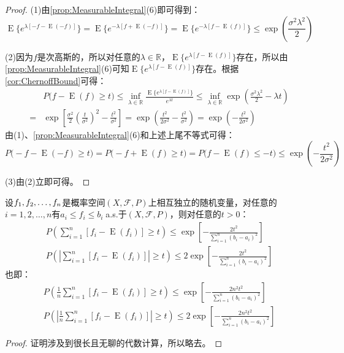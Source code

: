 \begin{proof}
	(1)由\cref{prop:MeasurableIntegral}(6)即可得到：
	\begin{equation*}
		\operatorname{E}\{e^{\lambda[-f-\operatorname{E}(-f)]}\}=\operatorname{E}\{e^{-\lambda[f+\operatorname{E}(-f)]}\}=\operatorname{E}\{e^{-\lambda[f-\operatorname{E}(f)]}\}\leqslant\exp\left(\frac{\sigma^2\lambda^2}{2}\right)
	\end{equation*}\par
	(2)因为$f$是次高斯的，所以对任意的$\lambda\in\mathbb{R}$，$\operatorname{E}\{e^{\lambda[f-\operatorname{E}(f)]}\}$存在，所以由\cref{prop:MeasurableIntegral}(6)可知$\operatorname{E}\{e^{\lambda[f-\operatorname{E}(f)]}\}$存在。根据\cref{cor:ChernoffBound}可得：
	\begin{align*}
		&P\Big(f-\operatorname{E}(f)\geqslant t\Big)\leqslant\inf_{\lambda\in\mathbb{R}}\frac{\operatorname{E}\{e^{\lambda[f-\operatorname{E}(f)]}\}}{e^{\lambda t}}\leqslant\inf_{\lambda\in\mathbb{R}}\exp\left(\frac{\sigma^2\lambda^2}{2}-\lambda t\right) \\
		=&\exp\left[\frac{\sigma^2}{2}\left(\frac{t}{\sigma^2}\right) ^2-\frac{t^2}{\sigma^2}\right]=\exp\left(\frac{t^2}{2\sigma^2}-\frac{t^2}{\sigma^2}\right)=\exp\left(-\frac{t^2}{2\sigma^2}\right)
	\end{align*}
	由(1)、\cref{prop:MeasurableIntegral}(6)和上述上尾不等式可得：
	\begin{equation*}
		P\Big(-f-\operatorname{E}(-f)\geqslant t\Big)=P\Big(-f+\operatorname{E}(f)\geqslant t\Big)=P\Big(f-\operatorname{E}(f)\leqslant -t\Big)\leqslant\exp\left(-\frac{t^2}{2\sigma^2}\right)
	\end{equation*}\par
	(3)由(2)立即可得。
\end{proof}
\begin{theorem}\label{theo:HoeffdingBound}
	设$f_1, f_2, \dots, f_{n}$是概率空间$(X,\mathscr{F},P)$上相互独立的随机变量，对任意的$i=1,2,\dots,n$有$a_i\leqslant f_i\leqslant b_i\;$a.s.于$(X,\mathscr{F},P)$，则对任意的$t>0$：
	\begin{gather*}
		P\left(\sum_{i=1}^{n}[f_i-\operatorname{E}(f_i)]\geqslant t\right)\leqslant\exp\left[-\frac{2t^2}{\sum\limits_{i=1}^{n}(b_i-a_i)^2}\right] \\ P\left(\left|\sum_{i=1}^{n}[f_i-\operatorname{E}(f_i)]\right|\geqslant t\right)\leqslant2\exp\left[-\frac{2t^2}{\sum\limits_{i=1}^{n}(b_i-a_i)^2}\right]
	\end{gather*}
	也即：
	\begin{gather*}
		P\left(\frac{1}{n}\sum_{i=1}^{n}[f_i-\operatorname{E}(f_i)]\geqslant t\right)\leqslant\exp\left[-\frac{2n^2t^2}{\sum\limits_{i=1}^{n}(b_i-a_i)^2}\right] \\ P\left(\left|\frac{1}{n}\sum_{i=1}^{n}[f_i-\operatorname{E}(f_i)]\right|\geqslant t\right)\leqslant2\exp\left[-\frac{2n^2t^2}{\sum\limits_{i=1}^{n}(b_i-a_i)^2}\right]
	\end{gather*}
\end{theorem}
\begin{proof}
	证明涉及到很长且无聊的代数计算，所以略去。
\end{proof}